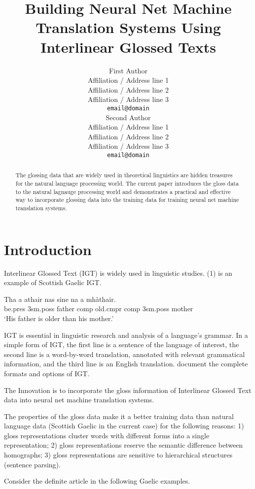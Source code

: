 \documentclass[11pt,a4paper]{article}
\title{Building Neural Net Machine Translation Systems Using Interlinear Glossed Texts}
\author{First Author \\
  Affiliation / Address line 1 \\
  Affiliation / Address line 2 \\
  Affiliation / Address line 3 \\
  {\tt email@domain} \\\And
  Second Author \\
  Affiliation / Address line 1 \\
  Affiliation / Address line 2 \\
  Affiliation / Address line 3 \\
  {\tt email@domain} \\}
\date{}
\begin{document}
\maketitle


\begin{abstract}
  The glossing data that are widely used in theoretical linguistics are hidden treasures for the natural language processing world. 
  The current paper introduces the gloss data to the natural lagnauge processing world and demonstrates a practical and effective way to incorporate glossing data into the training data for training neural net machine translation systems.   
\end{abstract}

\section{Introduction}
Interlinear Glossed Text (IGT) is widely used in linguistic studies. (1)  is an example of Scottish Gaelic IGT.
\begin{exe}  
\ex \gll    Tha a athair nas sine na a mh\`athair.\\  
            be.pres 3sm.poss father comp old.cmpr comp 3sm.poss mother
\\  
    \glt    `His father is older than his mother.'  
\end{exe}

IGT is essential in linguistic research and analysis of a language's grammar. In a simple form of IGT, the first line is a sentence of the language of interest, the second line is a word-by-word translation, annotated with relevant grammatical information, and the third line is an English translation. \citet{bickel2008leipzig} document the complete formats and options of IGT.  

The Innovation is to incorporate the gloss information of Interlinear Glossed Text data into neural net machine translation systems.

The properties of the gloss data make it a better training data than natural language data (Scottish Gaelic in the current case) for the following reasons: 1) gloss representations cluster words with different forms into a single representation; 2) gloss representations reserve the semantic difference between homographs; 3) gloss representations are sensitive to hierarchical structures (sentence parsing). 

Consider the definite article in the following Gaelic examples. 
\end{document}
